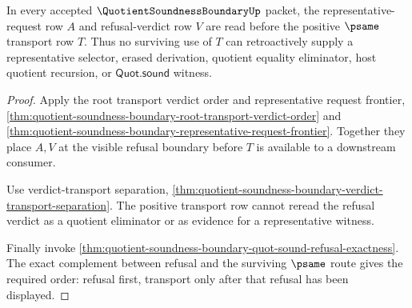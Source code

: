 \begin{theorem}
\label{thm:quotient-soundness-boundary-refusal-before-transport}
In every accepted $\QuotientSoundnessBoundaryUp$ packet, the representative-request row $A$ and refusal-verdict row $V$ are read before the positive $\psame$ transport row $T$. Thus no surviving use of $T$ can retroactively supply a representative selector, erased derivation, quotient equality eliminator, host quotient recursion, or $\mathsf{Quot.sound}$ witness.
\end{theorem}
\begin{proof}
Apply the root transport verdict order and representative request frontier, \autoref{thm:quotient-soundness-boundary-root-transport-verdict-order} and \autoref{thm:quotient-soundness-boundary-representative-request-frontier}. Together they place $A,V$ at the visible refusal boundary before $T$ is available to a downstream consumer.

Use verdict-transport separation, \autoref{thm:quotient-soundness-boundary-verdict-transport-separation}. The positive transport row cannot reread the refusal verdict as a quotient eliminator or as evidence for a representative witness.

Finally invoke \autoref{thm:quotient-soundness-boundary-quot-sound-refusal-exactness}. The exact complement between refusal and the surviving $\psame$ route gives the required order: refusal first, transport only after that refusal has been displayed.
\end{proof}

